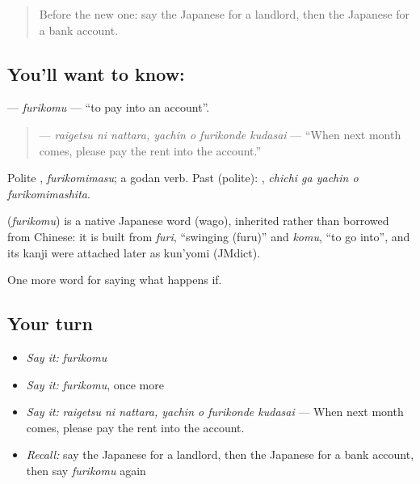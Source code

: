 \begin{quote}
Before the new one: say the Japanese for a landlord, then the Japanese for a bank account.
\end{quote}

\subsection*{You'll want to know: }
\textbf{} — \emph{furikomu} — \textquotedblleft{}to pay into an account\textquotedblright{}.

\begin{quote}
\textbf{   } — \emph{raigetsu ni nattara, yachin o furikonde kudasai} — \textquotedblleft{}When next month comes, please pay the rent into the account.\textquotedblright{}
\end{quote}

Polite \textbf{}, \emph{furikomimasu}; a godan verb. Past (polite): \textbf{  }, \emph{chichi ga yachin o furikomimashita}.

\begin{cousinweb}
\textbf{} (\emph{furikomu}) is a native Japanese word (wago), inherited rather than borrowed from Chinese: it is built from \emph{furi}, \textquotedblleft{}swinging (furu)\textquotedblright{} and \emph{komu}, \textquotedblleft{}to go into\textquotedblright{}, and its kanji were attached later as kun'yomi (JMdict).
\end{cousinweb}

\begin{grammarlens}[title={What you've built}]
One more word for saying what happens if.
\end{grammarlens}

\subsection*{Your turn}
\begin{itemize}
\raggedright
  \item \emph{Say it:} \emph{furikomu}
  \item \emph{Say it:} \emph{furikomu}, once more
  \item \emph{Say it:} \emph{raigetsu ni nattara, yachin o furikonde kudasai} — When next month comes, please pay the rent into the account.
  \item \emph{Recall:} say the Japanese for a landlord, then the Japanese for a bank account, then say \emph{furikomu} again
\end{itemize}

